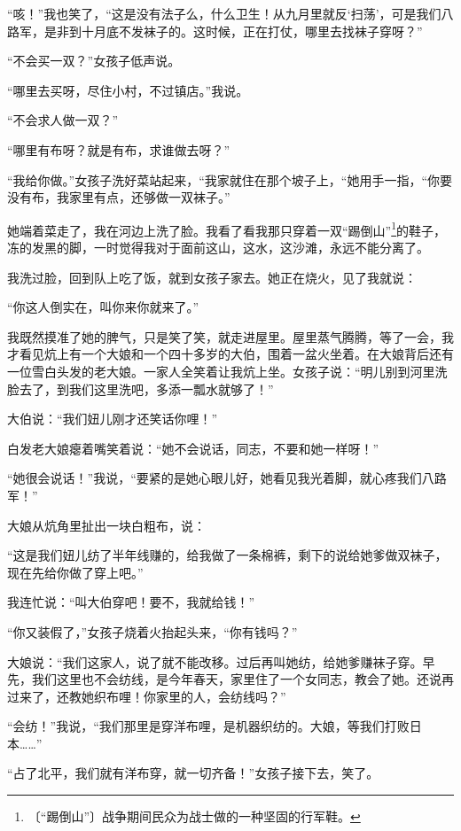 \documentclass[12pt,UTF-8,openany]{ctexbook}
\begin{document}
\begin{large}
    “咳！”我也笑了，“这是没有法子么，什么卫生！从九月里就反‘扫荡’，可是我们八路军，是非到十月底不发袜子的。这时候，正在打仗，哪里去找袜子穿呀？”
    
    “不会买一双？”女孩子低声说。
    
    “哪里去买呀，尽住小村，不过镇店。”我说。
    
    “不会求人做一双？”
    
    “哪里有布呀？就是有布，求谁做去呀？”
    
    “我给你做。”女孩子洗好菜站起来，“我家就住在那个坡子上，“她用手一指，“你要没有布，我家里有点，还够做一双袜子。”
    
    她端着菜走了，我在河边上洗了脸。我看了看我那只穿着一双“踢倒山”\footnote{〔“踢倒山”〕战争期间民众为战士做的一种坚固的行军鞋。}的鞋子，冻的发黑的脚，一时觉得我对于面前这山，这水，这沙滩，永远不能分离了。
    
    我洗过脸，回到队上吃了饭，就到女孩子家去。她正在烧火，见了我就说：
    
    “你这人倒实在，叫你来你就来了。”
    
    我既然摸准了她的脾气，只是笑了笑，就走进屋里。屋里蒸气腾腾，等了一会，我才看见炕上有一个大娘和一个四十多岁的大伯，围着一盆火坐着。在大娘背后还有一位雪白头发的老大娘。一家人全笑着让我炕上坐。女孩子说：“明儿别到河里洗脸去了，到我们这里洗吧，多添一瓢水就够了！”
    
    大伯说：“我们妞儿刚才还笑话你哩！”
    
    白发老大娘瘪着嘴笑着说：“她不会说话，同志，不要和她一样呀！”
    
    “她很会说话！”我说，“要紧的是她心眼儿好，她看见我光着脚，就心疼我们八路军！”
    
    大娘从炕角里扯出一块白粗布，说：
    
    “这是我们妞儿纺了半年线赚的，给我做了一条棉裤，剩下的说给她爹做双袜子，现在先给你做了穿上吧。”
    
    我连忙说：“叫大伯穿吧！要不，我就给钱！”
    
    “你又装假了，”女孩子烧着火抬起头来，“你有钱吗？”
    
    大娘说：“我们这家人，说了就不能改移。过后再叫她纺，给她爹赚袜子穿。早先，我们这里也不会纺线，是今年春天，家里住了一个女同志，教会了她。还说再过来了，还教她织布哩！你家里的人，会纺线吗？”
    
    “会纺！”我说，“我们那里是穿洋布哩，是机器织纺的。大娘，等我们打败日本……”
    
    “占了北平，我们就有洋布穿，就一切齐备！”女孩子接下去，笑了。
    

\end{large}
\end{document}
